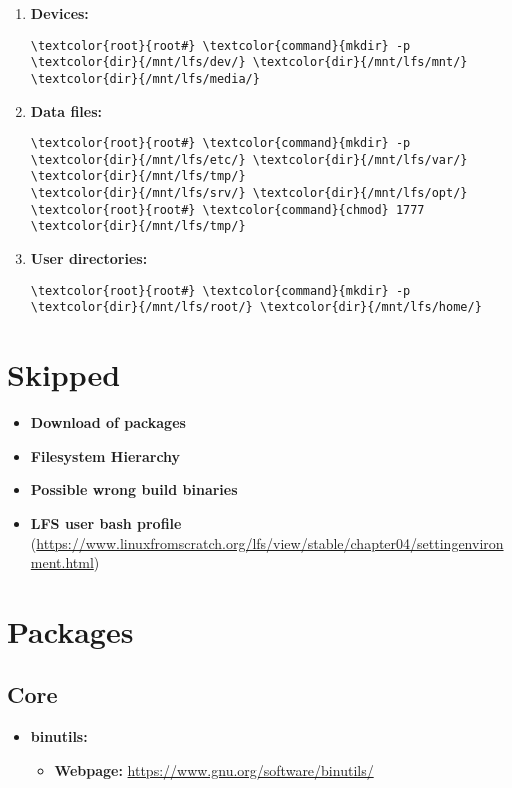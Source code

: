 \documentclass[10pt, a4paper, onecolumn, oneside, titlepage, openany]{book}
\begin{document}
\begin{enumerate}
    \item \textbf{Devices:}
\begin{Verbatim}[commandchars=\\\{\}]
\textcolor{root}{root#} \textcolor{command}{mkdir} -p \textcolor{dir}{/mnt/lfs/dev/} \textcolor{dir}{/mnt/lfs/mnt/} \textcolor{dir}{/mnt/lfs/media/}
\end{Verbatim}
    \item \textbf{Data files:}
\begin{Verbatim}[commandchars=\\\{\}]
\textcolor{root}{root#} \textcolor{command}{mkdir} -p \textcolor{dir}{/mnt/lfs/etc/} \textcolor{dir}{/mnt/lfs/var/} \textcolor{dir}{/mnt/lfs/tmp/}
\textcolor{dir}{/mnt/lfs/srv/} \textcolor{dir}{/mnt/lfs/opt/}
\textcolor{root}{root#} \textcolor{command}{chmod} 1777 \textcolor{dir}{/mnt/lfs/tmp/}
\end{Verbatim}
    \item \textbf{User directories:}
\begin{Verbatim}[commandchars=\\\{\}]
\textcolor{root}{root#} \textcolor{command}{mkdir} -p \textcolor{dir}{/mnt/lfs/root/} \textcolor{dir}{/mnt/lfs/home/}
\end{Verbatim}
\end{enumerate}


\chapter{Skipped}
\begin{itemize}
    \item \textbf{Download of packages}
    \item \textbf{Filesystem Hierarchy}
    \item \textbf{Possible wrong build binaries}
    \item \textbf{LFS user bash profile} (\url{https://www.linuxfromscratch.org/lfs/view/stable/chapter04/settingenvironment.html})
\end{itemize}


\chapter{Packages}
\section{Core}
\begin{itemize}
    \item \textbf{binutils:}
    \begin{itemize}
        \item \textbf{Webpage:} \url{https://www.gnu.org/software/binutils/}
    \end{itemize}
\end{itemize}
\end{document}
